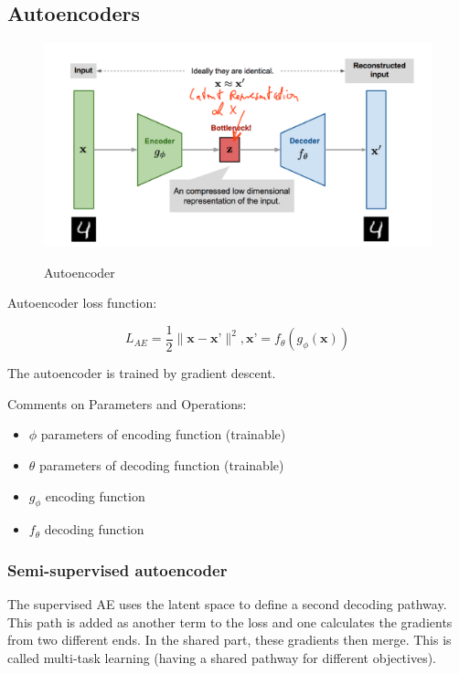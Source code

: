 \documentclass[main]{subfiles}
\begin{document}
\subsection{Autoencoders}

\begin{figure}[H]
	\centering
	\includegraphics[width=0.8\linewidth]{07_UnsupervisedAndSelfsupervisedLearning/figures/autoencoder.png}
	\label{fig:autoencoder}
	\caption{Autoencoder}
\end{figure}

Autoencoder loss function:

\begin{equation}
    L_{AE} = \frac{1}{2} \| \textbf{x} - \textbf{x'} \|^2, \textbf{x'} = f_\theta(g_\phi(\textbf{x}))
\end{equation}

The autoencoder is trained by gradient descent.

Comments on Parameters and Operations:
\begin{itemize}
    \item $\phi$ parameters of encoding function (trainable)
    \item $\theta$ parameters of decoding function (trainable)
    \item $g_\phi$ encoding function 
    \item $f_\theta$ decoding function
\end{itemize}

\subsubsection{Semi-supervised autoencoder}
The supervised AE uses the latent space to define a second decoding pathway. This path is added as another term to the loss and one calculates the gradients from two different ends. In the shared part, these gradients then merge. This is called multi-task learning (having a shared pathway for different objectives).
\end{document}

